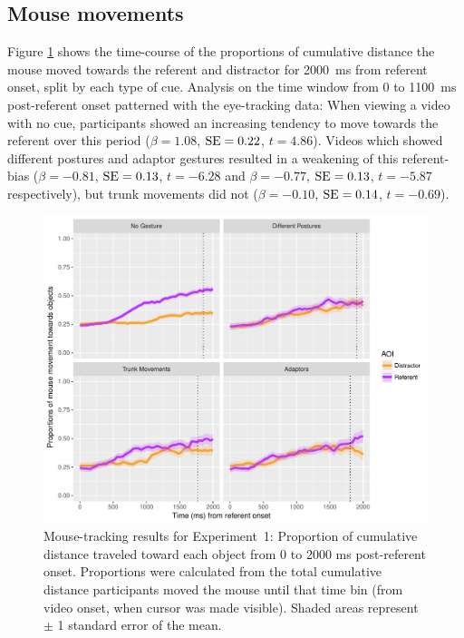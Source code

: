 \documentclass[a4paper,man,natbib]{apa6}
\newcommand{\resultsLM}[3]{$\beta = #1$, $\textnormal{SE} = #2$, $t #3$}
\begin{document}
\subsection{Mouse movements}
Figure \ref{fig:v1_mouse} shows the time-course of the proportions of cumulative distance the mouse moved towards the referent and distractor for 2000~ms from referent onset, split by each type of cue.
Analysis on the time window from 0 to 1100~ms post-referent onset patterned with the eye-tracking data:
When viewing a video with no cue, participants showed an increasing tendency to move towards the referent over this period (\resultsLM{1.08}{0.22}{=4.86}).
Videos which showed different postures and adaptor gestures resulted in a weakening of this referent-bias (\resultsLM{-0.81}{0.13}{=-6.28} and \resultsLM{-0.77}{0.13}{=-5.87} respectively), but trunk movements did not (\resultsLM{-0.10}{0.14}{=-0.69}). 

\begin{figure}[Ht]
  \centering
	\includegraphics[width=\linewidth]{./img/e7_mouset.pdf}
  \caption{Mouse-tracking results for Experiment~1: Proportion of cumulative distance traveled toward each object from 0 to 2000 ms post-referent onset. Proportions were calculated from the total cumulative distance participants moved the mouse until that time bin (from video onset, when cursor was made visible). Shaded areas represent $\pm$ 1 standard error of the mean.}
  \label{fig:v1_mouse}
\end{figure}
\end{document}
